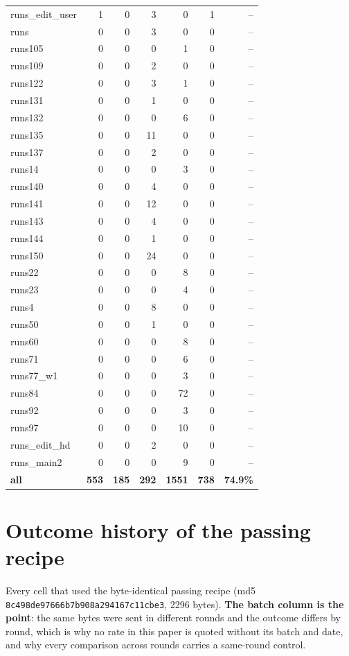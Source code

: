 \begin{longtable}{@{}lrrrrrr@{}}
runs\_edit\_user & 1 & 0 & 3 & 0 & 1 & -- \\
runs & 0 & 0 & 3 & 0 & 0 & -- \\
runs105 & 0 & 0 & 0 & 1 & 0 & -- \\
runs109 & 0 & 0 & 2 & 0 & 0 & -- \\
runs122 & 0 & 0 & 3 & 1 & 0 & -- \\
runs131 & 0 & 0 & 1 & 0 & 0 & -- \\
runs132 & 0 & 0 & 0 & 6 & 0 & -- \\
runs135 & 0 & 0 & 11 & 0 & 0 & -- \\
runs137 & 0 & 0 & 2 & 0 & 0 & -- \\
runs14 & 0 & 0 & 0 & 3 & 0 & -- \\
runs140 & 0 & 0 & 4 & 0 & 0 & -- \\
runs141 & 0 & 0 & 12 & 0 & 0 & -- \\
runs143 & 0 & 0 & 4 & 0 & 0 & -- \\
runs144 & 0 & 0 & 1 & 0 & 0 & -- \\
runs150 & 0 & 0 & 24 & 0 & 0 & -- \\
runs22 & 0 & 0 & 0 & 8 & 0 & -- \\
runs23 & 0 & 0 & 0 & 4 & 0 & -- \\
runs4 & 0 & 0 & 8 & 0 & 0 & -- \\
runs50 & 0 & 0 & 1 & 0 & 0 & -- \\
runs60 & 0 & 0 & 0 & 8 & 0 & -- \\
runs71 & 0 & 0 & 0 & 6 & 0 & -- \\
runs77\_w1 & 0 & 0 & 0 & 3 & 0 & -- \\
runs84 & 0 & 0 & 0 & 72 & 0 & -- \\
runs92 & 0 & 0 & 0 & 3 & 0 & -- \\
runs97 & 0 & 0 & 0 & 10 & 0 & -- \\
runs\_edit\_hd & 0 & 0 & 2 & 0 & 0 & -- \\
runs\_main2 & 0 & 0 & 0 & 9 & 0 & -- \\
\midrule
\textbf{all} & \textbf{553} & \textbf{185} & \textbf{292} & \textbf{1551} & \textbf{738} & \textbf{74.9\%} \\
\end{longtable}

\section{Outcome history of the passing recipe}
\label{app:goldhistory}

Every cell that used the byte-identical passing recipe (md5 \texttt{8c498de97666b7b908a294167c11cbe3}, 2296 bytes). \textbf{The batch column is the point}: the same bytes were sent in different rounds and the outcome differs by round, which is why no rate in this paper is quoted without its batch and date, and why every comparison across rounds carries a same-round control.

